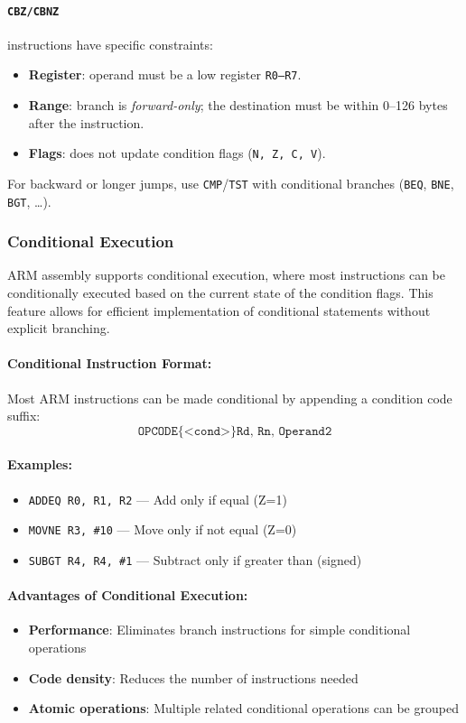 \paragraph{\texttt{CBZ/CBNZ}} instructions have specific constraints:
\begin{itemize}[nosep]
  \item \textbf{Register}: operand must be a low register \texttt{R0--R7}.
  \item \textbf{Range}: branch is \emph{forward-only}; the destination must be within 0--126 bytes after the instruction.
  \item \textbf{Flags}: does not update condition flags (\texttt{N, Z, C, V}).
\end{itemize}
For backward or longer jumps, use \texttt{CMP}/\texttt{TST} with conditional branches (\texttt{BEQ}, \texttt{BNE}, \texttt{BGT}, \dots).

\subsubsection{Conditional Execution}
ARM assembly supports conditional execution, where most instructions can be conditionally executed based on the current state of the condition flags. This feature allows for efficient implementation of conditional statements without explicit branching.

\paragraph{Conditional Instruction Format:}
Most ARM instructions can be made conditional by appending a condition code suffix:
\[
\texttt{OPCODE\{<cond>\} Rd, Rn, Operand2}
\]

\paragraph{Examples:}
\begin{itemize}[nosep]
    \item \texttt{ADDEQ R0, R1, R2} — Add only if equal (Z=1)
    \item \texttt{MOVNE R3, \#10} — Move only if not equal (Z=0)
    \item \texttt{SUBGT R4, R4, \#1} — Subtract only if greater than (signed)
\end{itemize}

\paragraph{Advantages of Conditional Execution:}
\begin{itemize}[nosep]
    \item \textbf{Performance}: Eliminates branch instructions for simple conditional operations
    \item \textbf{Code density}: Reduces the number of instructions needed
    \item \textbf{Atomic operations}: Multiple related conditional operations can be grouped
\end{itemize}

